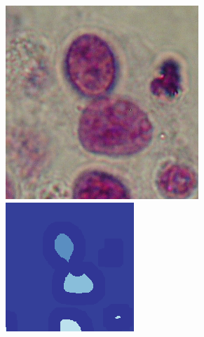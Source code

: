 \begin{figure}[t!]
	\centering	
	\includegraphics[width=0.97\linewidth]{Figures/Chapter2/6a1.png}
	\includegraphics[width=0.97\linewidth]{Figures/Chapter2/6b1.png}

\end{figure}
